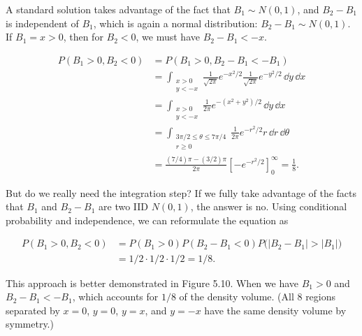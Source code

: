 \begin{solution}
A standard solution takes advantage of the fact that $B_1\sim N(0,1)$, and $B_2-B_1$
is independent of $B_1$, which is again a normal distribution: $B_2-B_1\sim N(0,1)$.
If $B_1=x>0$, then for $B_2<0$, we must have $B_2-B_1<-x$.

\[
\begin{aligned}
P(B_1>0,B_2<0)
 &=P(B_1>0,B_2-B_1<-B_1)\\
 &=\int_{\substack{x>0\\y<-x}}
   \frac{1}{\sqrt{2\pi}}e^{-x^2/2}
   \frac{1}{\sqrt{2\pi}}e^{-y^2/2}\,\dd y\,\dd x\\
 &=\int_{\substack{x>0\\y<-x}}
   \frac{1}{2\pi}e^{-(x^2+y^2)/2}\,\dd y\,\dd x\\
 &=\int_{\substack{3\pi/2\le\theta\le7\pi/4\\r\ge0}}
   \frac{1}{2\pi}e^{-r^2/2}r\,\dd r\,\dd\theta\\
 &=\frac{(7/4)\pi-(3/2)\pi}{2\pi}
   \left[-e^{-r^2/2}\right]_0^\infty=\frac{1}{8}.
\end{aligned}
\]

But do we really need the integration step? If we fully take advantage of the facts that
$B_1$ and $B_2-B_1$ are two IID $N(0,1)$, the answer is no. Using conditional
probability and independence, we can reformulate the equation as

\[
\begin{aligned}
P(B_1>0,B_2<0)
 &=P(B_1>0)P(B_2-B_1<0)P\bigl(\lvert B_2-B_1\rvert>\lvert B_1\rvert\bigr)\\
 &=1/2\cdot1/2\cdot1/2=1/8.
\end{aligned}
\]



This approach is better demonstrated in Figure 5.10. When we have $B_1>0$ and
$B_2-B_1<-B_1$, which accounts for $1/8$ of the density volume. (All 8 regions
separated by $x=0$, $y=0$, $y=x$, and $y=-x$ have the same density volume by symmetry.)


\end{solution}
